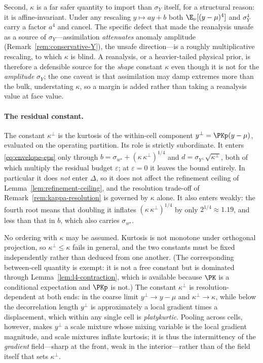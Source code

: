 \begin{remark}
Second, $\kappa$ is a far safer quantity to import than $\sigma_Y$
itself, for a structural reason: it is affine-invariant. Under any
rescaling $y\mapsto ay+b$ both $\E_\nu[(y-\mu)^4]$ and $\sigma_Y^4$ carry
a factor $a^4$ and cancel. The specific defect that made the reanalysis
unsafe as a source of $\sigma_Y$---assimilation \emph{attenuates}
anomaly amplitude (Remark~\ref{rem:conservative-Y}), the unsafe
direction---is a roughly multiplicative rescaling, to which $\kappa$ is
blind. A reanalysis, or a heavier-tailed physical prior, is therefore a
defensible source for the \emph{shape} constant $\kappa$ even though it
is not for the \emph{amplitude} $\sigma_Y$; the one caveat is that
assimilation may damp extremes more than the bulk, understating $\kappa$,
so a margin is added rather than taking a reanalysis value at face value.

\paragraph*{The residual constant.}
The constant $\kappa^{\perp}$ is the kurtosis of the within-cell
component $y^{\perp}=\PKp(y-\mu)$, evaluated on the operating partition.
Its role is strictly subordinate. It enters \eqref{eq:envelope-eps} only
through $b=\sigma_{w^{\star}}+(\kappa\,\kappa^{\perp})^{1/4}$ and
$d=\sigma_{Y^{\perp}}\sqrt{\kappa^{\perp}}$, both of which multiply the
residual budget $\varepsilon$; at $\varepsilon=0$ it leaves the bound
entirely. In particular it does \emph{not} enter $\Delta$, so it does not
affect the refinement ceiling of Lemma~\ref{lem:refinement-ceiling}, and
the resolution trade-off of Remark~\ref{rem:kappa-resolution} is governed
by $\kappa$ alone. It also enters weakly: the fourth root means that
doubling it inflates $(\kappa\,\kappa^{\perp})^{1/4}$ by only
$2^{1/4}\approx1.19$, and less than that in $b$, which also carries
$\sigma_{w^{\star}}$.

No ordering with $\kappa$ may be assumed. Kurtosis is not monotone under
orthogonal projection, so $\kappa^{\perp}\le\kappa$ fails in general, and
the two constants must be fixed independently rather than deduced from
one another. (The corresponding between-cell quantity is exempt: it is
not a free constant but is dominated through
Lemma~\ref{lem:l4-contraction}, which is available because $\PK$ is a
conditional expectation and $\PKp$ is not.) The constant $\kappa^{\perp}$
is
resolution-dependent at both ends: in the coarse limit
$y^{\perp}\to y-\mu$ and $\kappa^{\perp}\to\kappa$, while below the
decorrelation length $y^{\perp}$ is approximately a local gradient times
a displacement, which within any single cell is \emph{platykurtic}.
Pooling across cells, however, makes $y^{\perp}$ a scale mixture whose
mixing variable is the local gradient magnitude, and scale mixtures
inflate kurtosis; it is thus the intermittency of the \emph{gradient}
field---sharp at the front, weak in the interior---rather than of the
field itself that sets $\kappa^{\perp}$.


\end{remark}
